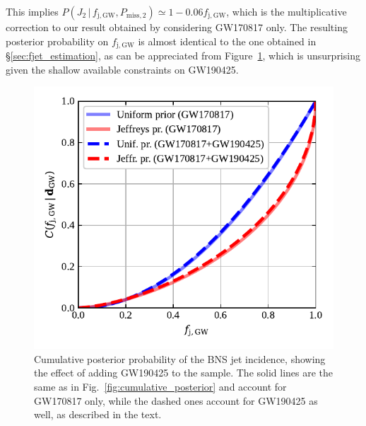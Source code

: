 \documentclass[]{aa}
\newcommand{\resp}[1]{#1}
\begin{document}
\begin{appendix}
This implies $P(J_2\,|\,f_\mathrm{j,GW},P_{\mathrm{miss},2}) \simeq 1 - 0.06 f_\mathrm{j,GW}$, which is the multiplicative correction to our result obtained by considering GW170817 only. The resulting posterior probability on $f_\mathrm{j,GW}$ is almost identical to the one obtained in \S\ref{sec:fjet_estimation}, as can be appreciated from Figure~\ref{fig:fjGW_multiple}, which is unsurprising given the shallow available constraints on GW190425.
%
\begin{figure}
 \centering\includegraphics[width=\columnwidth]{figures/cumulative_posterior_2events.pdf}
 \caption{\small Cumulative posterior probability of the BNS jet \resp{incidence}, showing the effect of adding GW190425 to the sample. The solid lines are the same as in Fig.~\ref{fig:cumulative_posterior} and account for GW170817 only, while the dashed ones account for GW190425 as well, as described in the text.}
 \label{fig:fjGW_multiple} 
\end{figure}




\end{appendix}
\end{document}

